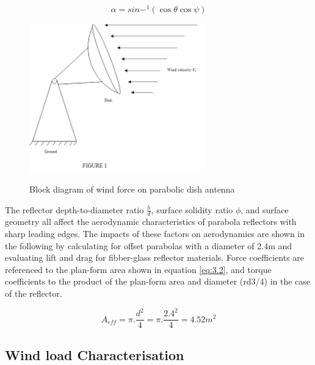{\begin{equation}
    \alpha = sin-^1 (\cos \theta \cos \psi)  \label{eq:3.2}
\end{equation}

\begin{figure}
    \centering
    \includegraphics[width=3in]{Figures/wind_load_on_antenna.png}
    \caption{Block diagram of wind force on parabolic dish antenna }
    \cite{}
    \label{fig:3.3}
\end{figure}

The reflector depth-to-diameter ratio \(\frac{h}{d}\), surface solidity ratio \(\phi\), and surface geometry all affect the aerodynamic characteristics of parabola reflectors with sharp leading edges. The impacts of these factors on aerodynamics are shown in the following by calculating for offset parabolas with a diameter of 2.4m and evaluating lift and drag for fibber-glass reflector materials. Force coefficients are referenced to the plan-form area shown in equation \ref{eq:3.2}, and torque coefficients to the product of the plan-form area and diameter (rd3/4) in the case of the reflector. 


\begin{equation}
{A}_{{eff}} = {\pi}.\frac{d^2}{4} = {\pi}.\frac{{2.4}^2}{4} = 4.52m^2  \label{eq:3.3}
 \end{equation}
 


 \subsection{Wind load Characterisation}
 
}
